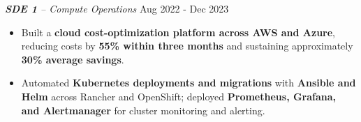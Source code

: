 \textit{\textbf{SDE 1} – Compute Operations}
\hfill {\faCalendar} Aug 2022 - Dec 2023 \par
\begin{itemize}
\item Built a \textbf{cloud cost-optimization platform across AWS and Azure}, reducing costs by \textbf{55\% within three months} and sustaining approximately \textbf{30\% average savings}.
\item Automated \textbf{Kubernetes deployments and migrations} with \textbf{Ansible and Helm} across Rancher and OpenShift; deployed \textbf{Prometheus, Grafana, and Alertmanager} for cluster monitoring and alerting.
\end{itemize}
